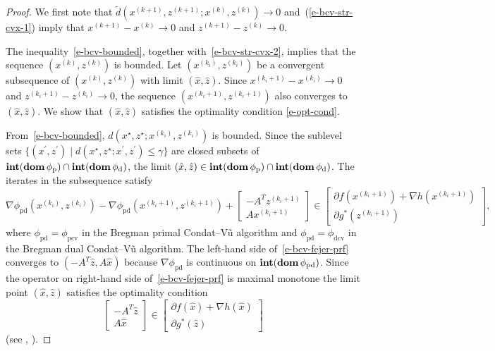 \documentclass[letterpaper,11pt]{article}
\newcommand{\dom}{\mathop{\bf dom}}
\newcommand{\intr}{\mathop{\bf int}}
\newcommand{\primal}{\mathrm p}
\newcommand{\dual}{\mathrm d}
\begin{document}
\begin{proof}
We first note that  
$\tilde d(x^{(k+1)}, z^{(k+1)}; x^{(k)}, z^{(k)}) \rightarrow 0$
and~(\ref{e-bcv-str-cvx-1})
imply that $x^{(k+1)} -x^{(k)} \rightarrow 0$ and
$z^{(k+1)} -z^{(k)} \rightarrow 0$.

The inequality~\eqref{e-bcv-bounded}, together with~\eqref{e-bcv-str-cvx-2},
implies that the sequence $(x^{(k)},z^{(k)})$ is bounded.
Let $(x^{(k_i)},z^{(k_i)})$ be a convergent subsequence of 
$(x^{(k)}, z^{(k)})$ with limit $(\hat x, \hat z)$.
Since $x^{(k_i+1)}-x^{(k_i)} \rightarrow 0$ and
$z^{(k_i+1)} -z^{(k_i)} \rightarrow 0$, the sequence
$(x^{(k_i+1)},z^{(k_i+1)})$ also converges to $(\hat x, \hat z)$.
We show that $(\hat x,\hat z)$ satisfies the optimality condition
\eqref{e-opt-cond}.

From~\eqref{e-bcv-bounded}, $d(x^\star,z^\star;x^{(k_i)},z^{(k_i)})$
is bounded.
Since the sublevel sets $\{(x^\prime,z^\prime) \mid d(x^\star,z^\star;
x^\prime,z^\prime) \leq \gamma\}$ are closed subsets of
$\intr(\dom \phi_\primal) \cap \intr(\dom \phi_\dual)$,
the limit $(\hat x,\hat z) \in
\intr(\dom \phi_\primal) \cap \intr(\dom \phi_\dual)$.
The iterates in the subsequence satisfy
\begin{equation} \label{e-bcv-fejer-prf}
\nabla \phi_\mathrm{pd} (x^{(k_i)},z^{(k_i)})
-\nabla \phi_\mathrm{pd} (x^{(k_i+1)},z^{(k_i+1)})
+\begin{bmatrix} -A^Tz^{(k_i+1)} \\ Ax^{(k_i+1)} \end{bmatrix} \in
\begin{bmatrix} \partial f(x^{(k_i+1)})+\nabla h(x^{(k_i+1)}) \\
\partial g^\ast(z^{(k_i+1)}) \end{bmatrix},
\end{equation} 
where $\phi_\mathrm{pd}=\phi_\mathrm{pcv}$ in the Bregman primal
Condat--V\~u algorithm and $\phi_\mathrm{pd}=\phi_\mathrm{dcv}$
in the Bregman dual Condat--V\~u algorithm.
The left-hand side of~\eqref{e-bcv-fejer-prf}
converges to $(-A^T\hat z, A\hat x)$ because $\nabla \phi_\mathrm{pd}$ is 
continuous on $\intr(\dom \phi_\mathrm{pd})$.  
Since the operator on right-hand side of~\eqref{e-bcv-fejer-prf} is 
maximal monotone the limit point $(\hat x,\hat z)$ satisfies 
the optimality condition
\[
\begin{bmatrix} -A^T\hat z \\ A\hat x \end{bmatrix} \in 
\begin{bmatrix} \partial f(\hat x)+\nabla h(\hat x) \\
\partial g^\ast(\hat z) \end{bmatrix}
\]
(see \cite[page~27]{Bre:73}, \cite[Lemma~3.2]{Tse:00}).


\end{proof}
\end{document}
